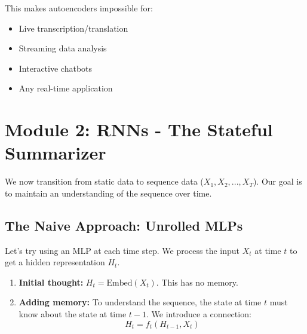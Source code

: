 \documentclass{article}
\begin{document}
\begin{center}
\end{center}

This makes autoencoders impossible for:
\begin{itemize}
\item Live transcription/translation
\item Streaming data analysis
\item Interactive chatbots
\item Any real-time application
\end{itemize}


\section{Module 2: RNNs - The Stateful Summarizer}

We now transition from static data to sequence data ($X_1, X_2, ..., X_T$). Our goal is to maintain an understanding of the sequence over time.

\subsection{The Naive Approach: Unrolled MLPs}

Let's try using an MLP at each time step. We process the input $X_t$ at time $t$ to get a hidden representation $H_t$.

\begin{enumerate}
    \item \textbf{Initial thought:} $H_t = \text{Embed}(X_t)$. This has no memory.
    \item \textbf{Adding memory:} To understand the sequence, the state at time $t$ must know about the state at time $t-1$. We introduce a connection:
    $$H_t = f_t(H_{t-1}, X_t)$$
\end{enumerate}
\end{document}
